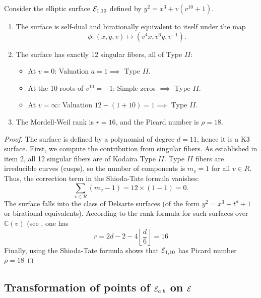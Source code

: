 \documentclass[11pt]{amsart}
\begin{document}
\begin{cor}
	\label{cor:E1_10}
	Consider the elliptic surface ${\mathcal E}_{1,10}$ defined by $y^2 = x^3 + v(v^{10}+1)$.
	\begin{enumerate}
		\item  The  surface is self-dual and birationally equivalent to itself under the map
		$$\phi: (x, y, v) \mapsto (v^{4}x, v^{6}y, v^{-1}).$$
		\item   The surface has exactly 12 singular fibers, all of Type $II$:
		\begin{itemize}
			\item At $v=0$: Valuation $a=1 \implies$ Type $II$.
			\item At the 10 roots of $v^{10}=-1$: Simple zeros $\implies$ Type $II$.
			\item At $v=\infty$: Valuation $12-(1+10)=1 \implies$ Type $II$.
		\end{itemize}
		\item  The Mordell-Weil rank is $r = 16$, and the Picard number is $\rho = 18$.
	\end{enumerate}
\end{cor}

\begin{proof}
	The surface is defined by a polynomial of degree $d=11$, hence it is a K3 surface.
	First, we compute the contribution from singular fibers. As established in item 2, all 12 singular fibers are of Kodaira Type $II$. Type $II$ fibers are irreducible curves (cusps), so the number of components is $m_v = 1$ for all $v \in R$. Thus, the correction term in the Shioda-Tate formula vanishes:
	\[
	\sum_{v \in R} (m_v - 1) = 12 \times (1-1) = 0.
	\]
 The surface falls into the class of Delsarte surfaces (of the form $y^2 = x^3 + t^d + 1$ or birational equivalents). According to the rank formula for such surfaces over $\mathbb{C}(v)$ (see \cite[Section 13.2.2]{Schuett2019}, one has
	\[
	r = 2d - 2 - 4 \left\lfloor \frac{d}{6} \right\rfloor= 16
	\]
	Finally, using the Shioda-Tate formula shows
 that ${\mathcal E}_{1, 10}$ has   Picard number $\rho = 18$
\end{proof}








\subsection{Transformation of points of ${\mathcal E}_{a,b}$ on ${\mathcal E}$}
\end{document}
